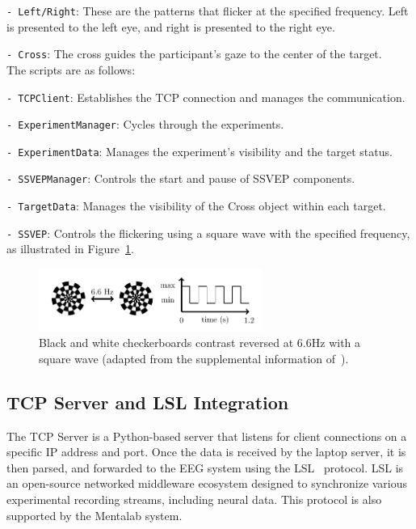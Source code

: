 \texttt{- Left/Right}: These are the patterns that flicker at the specified frequency. Left is presented to the left eye, and right is presented to the right eye.

\texttt{- Cross}: The cross guides the participant's gaze to the center of the target. 
\\

The scripts are as follows:

\texttt{- TCPClient}: Establishes the TCP connection and manages the communication.

\texttt{- ExperimentManager}: Cycles through the experiments.

\texttt{- ExperimentData}: Manages the experiment's visibility and the target status.

\texttt{- SSVEPManager}: Controls the start and pause of SSVEP components.

\texttt{- TargetData}: Manages the visibility of the Cross object within each target.

\texttt{- SSVEP}: Controls the flickering using a square wave with the specified frequency, as illustrated in Figure~\ref{fig:SSVEP}.

\begin{figure}[ht]
    \centering
    \includegraphics[width=0.65\textwidth]{images/methods/SSVEP.pdf}
    \caption{Black and white checkerboards contrast reversed at 6.6Hz with a square wave (adapted from the supplemental information of~\cite{ZHANG2011362}).}
    \label{fig:SSVEP} 
\end{figure}

\subsection{TCP Server and LSL Integration}

The TCP Server is a Python-based server that listens for client connections on a specific IP address and port. Once the data is received by the laptop server, it is then parsed, and forwarded to the EEG system using the LSL~\cite{lsl} protocol. LSL is an open-source networked middleware ecosystem designed to synchronize various experimental recording streams, including neural data. This protocol is also supported by the Mentalab system.

